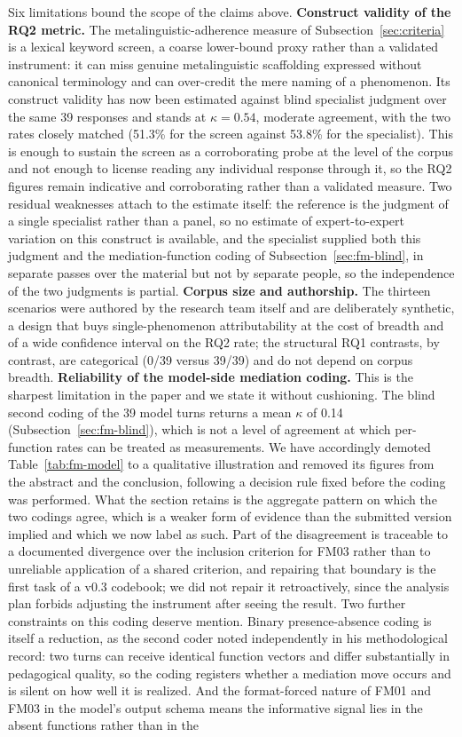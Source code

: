 \documentclass{sbc2023}%
\begin{document}
Six limitations bound the scope of the claims above. \textbf{Construct validity of the RQ2 metric.} The metalinguistic-adherence measure of Subsection~\ref{sec:criteria} is a lexical keyword screen, a coarse lower-bound proxy rather than a validated instrument: it can miss genuine metalinguistic scaffolding expressed without canonical terminology and can over-credit the mere naming of a phenomenon. Its construct validity has now been estimated against blind specialist judgment over the same 39 responses and stands at $\kappa = 0.54$, moderate agreement, with the two rates closely matched (51.3\% for the screen against 53.8\% for the specialist). This is enough to sustain the screen as a corroborating probe at the level of the corpus and not enough to license reading any individual response through it, so the RQ2 figures remain indicative and corroborating rather than a validated measure. Two residual weaknesses attach to the estimate itself: the reference is the judgment of a single specialist rather than a panel, so no estimate of expert-to-expert variation on this construct is available, and the specialist supplied both this judgment and the mediation-function coding of Subsection~\ref{sec:fm-blind}, in separate passes over the material but not by separate people, so the independence of the two judgments is partial. \textbf{Corpus size and authorship.} The thirteen scenarios were authored by the research team itself and are deliberately synthetic, a design that buys single-phenomenon attributability at the cost of breadth and of a wide confidence interval on the RQ2 rate; the structural RQ1 contrasts, by contrast, are categorical (0/39 versus 39/39) and do not depend on corpus breadth. \textbf{Reliability of the model-side mediation coding.} This is the sharpest limitation in the paper and we state it without cushioning. The blind second coding of the 39 model turns returns a mean $\kappa$ of 0.14 (Subsection~\ref{sec:fm-blind}), which is not a level of agreement at which per-function rates can be treated as measurements. We have accordingly demoted Table~\ref{tab:fm-model} to a qualitative illustration and removed its figures from the abstract and the conclusion, following a decision rule fixed before the coding was performed. What the section retains is the aggregate pattern on which the two codings agree, which is a weaker form of evidence than the submitted version implied and which we now label as such. Part of the disagreement is traceable to a documented divergence over the inclusion criterion for FM03 rather than to unreliable application of a shared criterion, and repairing that boundary is the first task of a v0.3 codebook; we did not repair it retroactively, since the analysis plan forbids adjusting the instrument after seeing the result. Two further constraints on this coding deserve mention. Binary presence-absence coding is itself a reduction, as the second coder noted independently in his methodological record: two turns can receive identical function vectors and differ substantially in pedagogical quality, so the coding registers whether a mediation move occurs and is silent on how well it is realized. And the format-forced nature of FM01 and FM03 in the model's output schema means the informative signal lies in the absent functions rather than in the 
\end{document}
